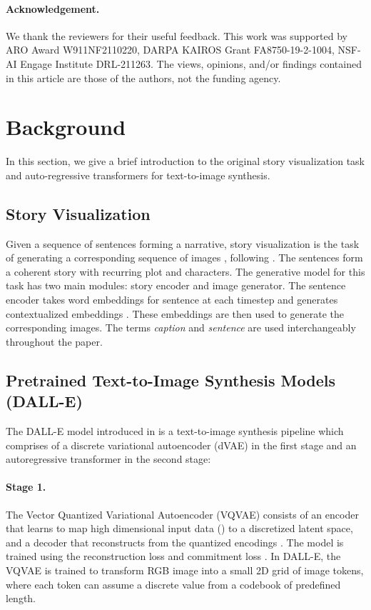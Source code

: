 \documentclass[runningheads]{llncs}
\begin{document}
\paragraph{Acknowledgement.} We thank the reviewers for their useful feedback. This work was supported by ARO Award W911NF2110220, DARPA KAIROS Grant FA8750-19-2-1004, NSF-AI Engage Institute DRL-211263. The views, opinions, and/or findings contained in this article are those of the authors, not the funding agency.






\appendix{}


\section{Background}
In this section, we give a brief introduction to the original story visualization task and auto-regressive transformers for text-to-image synthesis.

\subsection{Story Visualization}
\label{sec:sviz}
Given a sequence of sentences  forming a narrative, story visualization is the task of generating a corresponding sequence of images , following \cite{li2019storygan}. The sentences form a coherent story with recurring plot and characters. The generative model for this task has two main modules: story encoder and image generator. The sentence encoder  takes word embeddings  for sentence  at each timestep  and generates contextualized embeddings . These embeddings are then used to generate the corresponding images. The terms \textit{caption} and \textit{sentence} are used interchangeably throughout the paper.


\subsection{Pretrained Text-to-Image Synthesis Models (DALL-E)}
The DALL-E model introduced in \cite{ramesh2021zero} is a text-to-image synthesis pipeline which comprises of a discrete variational autoencoder (dVAE) in the first stage and an autoregressive transformer in the second stage:

\paragraph{Stage 1.} The Vector Quantized Variational Autoencoder (VQVAE) \cite{van2016conditional} consists of an encoder that learns to map high dimensional input data () to a discretized latent space, and a decoder that reconstructs  from the quantized encodings . The model is trained using the reconstruction loss and commitment loss \cite{van2017neural}. In DALL-E, the VQVAE is trained to transform RGB image into a small 2D grid of image tokens, where each token can assume a discrete value from a codebook of predefined length.
\end{document}
